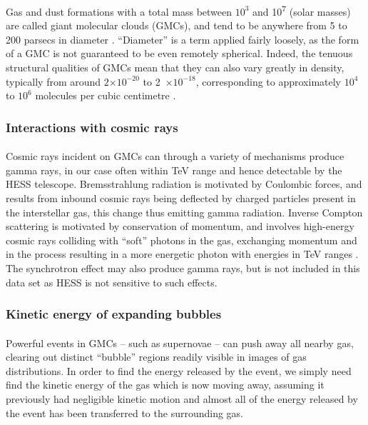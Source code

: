 \documentclass[a4paper, titlepage, oneside]{article}
\newcommand{\e}[1]{\ensuremath{\times 10^{#1}}}
\newcommand{\smass}{\mathrm{M_\odot}}
\begin{document}
\begin{multicols}{2}
Gas and dust formations with a total mass between \(10^3\) and \unit{10^7}{\smass} (solar masses) are called giant molecular clouds (GMCs), and tend to be anywhere from 5 to 200 parsecs in diameter \parencite{Murray:2011}. ``Diameter'' is a term applied fairly loosely, as the form of a GMC is not guaranteed to be even remotely spherical. Indeed, the tenuous structural qualities of GMCs mean that they can also vary greatly in density, typically from around \(2\e{-20}\) to \unit{2\e{-18}}{\gram\usk\centi\metre\rpcubed}, corresponding to approximately \(10^4\) to \(10^6\) molecules per cubic centimetre \parencite{Ferriere:2001}.

\subsubsection{Interactions with cosmic rays}
\paragraph{}
Cosmic rays incident on GMCs can through a variety of mechanisms produce gamma rays, in our case often within TeV range and hence detectable by the HESS telescope. Bremsstrahlung radiation is motivated by Coulombic forces, and results from inbound cosmic rays being deflected by charged particles present in the interstellar gas, this change thus emitting gamma radiation. Inverse Compton scattering is motivated by conservation of momentum, and involves high-energy cosmic rays colliding with ``soft'' photons in the gas, exchanging momentum and in the process resulting in a more energetic photon with energies in TeV ranges \parencite{Ferriere:2001}. The synchrotron effect may also produce gamma rays, but is not included in this data set as HESS is not sensitive to such effects.

\subsubsection{Kinetic energy of expanding bubbles}
\label{sec:kinetic}
\paragraph{}
Powerful events in GMCs -- such as supernovae -- can push away all nearby gas, clearing out distinct ``bubble'' regions readily visible in images of gas distributions. In order to find the energy released by the event, we simply need find the kinetic energy of the gas which is now moving away, assuming it previously had negligible kinetic motion and almost all of the energy released by the event has been transferred to the surrounding gas.


\end{multicols}
\end{document}
